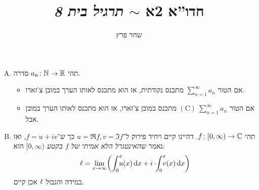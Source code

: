 \documentclass[]{../../../../tex/classes/homework}
\author{שחר פרץ}
\title{חדו''א 2א $\sim$ \textit{תרגיל בית 8}}
\begin{document}
	\maketitle
	\section{}
	\begin{enumerate}[(A)]
		\item תהי $a_n \colon \mathbb{N} \to \mathbb{R}$ סדרה. 
		\begin{itemize}
			\item אם הטור $\sum^{\infty}_{n = 1} a_n$ מתכנס נקודתית, אז הוא מתכנס לאותו הערך במובן צ'זארו. 
			\item אם הטור $(\mathrm C) \ \sum^{\infty}_{n = 1} a_n$ מתכנס במובן צ'זארו, אז הוא מתכנס לאותו הערך במובן אבל. 
		\end{itemize}
		\item תהי $f \colon [0, \infty) \to \mathbb{C}$. דהיינו קיים ויחיד פירוק ל־$u = \Re f, v = \Im f$ כך ש־$f = u + iv$, ואז נאמר ש\textit{האינטגרל הלא אמיתי של $f$ בקטע $[0, \infty)$} הוא:
		\[ \ml = \lim_{x \to \infty}\!\cl{\int^{x}_0 \dequad \ u(x)\dx + i \cdot \!\!\int^{x}_0 \dequad \ v(x)\dx} \]
		במידה והגבול $\ell$ אכן קיים. 
	\end{enumerate}
	
\end{document}
